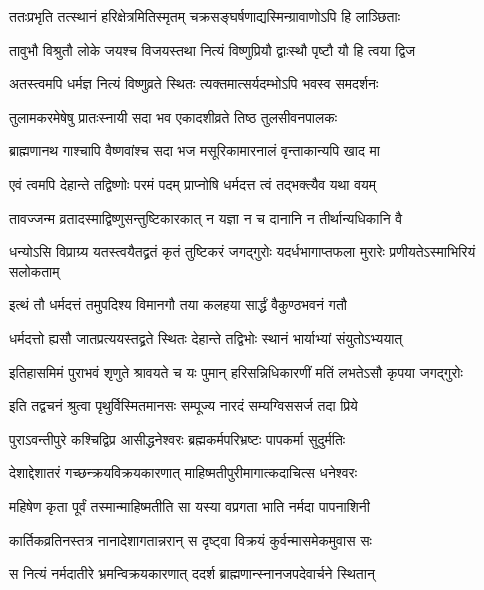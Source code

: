 \twolineshloka
{ततःप्रभृति तत्स्थानं हरिक्षेत्रमितिस्मृतम्}
{चक्रसङ्घर्षणाद्यस्मिन्ग्रावाणोऽपि हि लाञ्छिताः} %

\twolineshloka
{तावुभौ विश्रुतौ लोके जयश्च विजयस्तथा}
{नित्यं विष्णुप्रियौ द्वाःस्थौ पृष्टौ यौ हि त्वया द्विज} %

\twolineshloka
{अतस्त्वमपि धर्मज्ञ नित्यं विष्णुव्रते स्थितः}
{त्यक्तमात्सर्यदम्भोऽपि भवस्व समदर्शनः} %

\twolineshloka
{तुलामकरमेषेषु प्रातःस्नायी सदा भव}
{एकादशीव्रते तिष्ठ तुलसीवनपालकः} %

\twolineshloka
{ब्राह्मणानथ गाश्चापि वैष्णवांश्च सदा भज}
{मसूरिकामारनालं वृन्ताकान्यपि खाद मा} %

\twolineshloka
{एवं त्वमपि देहान्ते तद्विष्णोः परमं पदम्}
{प्राप्नोषि धर्मदत्त त्वं तद्भक्त्यैव यथा वयम्} %

\twolineshloka
{तावज्जन्म व्रतादस्माद्विष्णुसन्तुष्टिकारकात्}
{न यज्ञा न च दानानि न तीर्थान्यधिकानि वै} %

\twolineshloka
{धन्योऽसि विप्राग्र्य यतस्त्वयैतद्व्रतं कृतं तुष्टिकरं जगद्गुरोः}
{यदर्धभागाप्तफला मुरारेः प्रणीयतेऽस्माभिरियं सलोकताम्} %


\twolineshloka
{इत्थं तौ धर्मदत्तं तमुपदिश्य विमानगौ}
{तया कलहया सार्द्धं वैकुण्ठभवनं गतौ} %

\twolineshloka
{धर्मदत्तो ह्यसौ जातप्रत्ययस्तद्व्रते स्थितः}
{देहान्ते तद्विभोः स्थानं भार्याभ्यां संयुतोऽभ्ययात्} %

\twolineshloka
{इतिहासमिमं पुराभवं शृणुते श्रावयते च यः पुमान्}
{हरिसन्निधिकारणीं मतिं लभतेऽसौ कृपया जगद्गुरोः} %





\twolineshloka
{इति तद्वचनं श्रुत्वा पृथुर्विस्मितमानसः}
{सम्पूज्य नारदं सम्यग्विससर्ज तदा प्रिये} %

\twolineshloka
{पुराऽवन्तीपुरे कश्चिद्विप्र आसीद्धनेश्वरः}
{ब्रह्मकर्मपरिभ्रष्टः पापकर्मा सुदुर्मतिः} %

\twolineshloka
{देशाद्देशातरं गच्छन्क्रयविक्रयकारणात्}
{माहिष्मतीपुरीमागात्कदाचित्स धनेश्वरः} %

\twolineshloka
{महिषेण कृता पूर्वं तस्मान्माहिष्मतीति सा}
{यस्या वप्रगता भाति नर्मदा पापनाशिनी} %

\twolineshloka
{कार्तिकव्रतिनस्तत्र नानादेशागतान्नरान्}
{स दृष्ट्वा विक्रयं कुर्वन्मासमेकमुवास सः} %

\twolineshloka
{स नित्यं नर्मदातीरे भ्रमन्विक्रयकारणात्}
{ददर्श ब्राह्मणान्स्नानजपदेवार्चने स्थितान्} %

